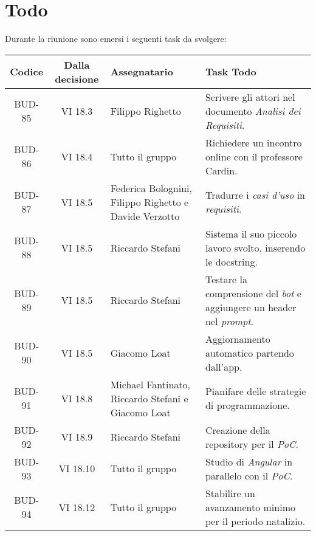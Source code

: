 
\section{Todo}

Durante la riunione sono emersi i seguenti task da svolgere:

\vspace{0.5cm}

\begin{table}[htbp]
\centering
{}
\begin{tabular}{|c|c|p{}|p{}|}
    \hline
    \rowcolor[gray]{0.75}
    \textbf{Codice} & \textbf{Dalla decisione} & \textbf{Assegnatario} & \textbf{Task Todo} \\
    \hline
    BUD-85 & VI 18.3 & Filippo Righetto & Scrivere gli attori nel documento \emph{Analisi dei Requisiti}. \\
    \hline
    BUD-86 & VI 18.4 & Tutto il gruppo & Richiedere un incontro online con il professore Cardin. \\
    \hline
    BUD-87 & VI 18.5 & Federica Bolognini, Filippo Righetto e Davide Verzotto & Tradurre i \emph{casi d'uso} in \emph{requisiti}. \\
    \hline
    BUD-88 & VI 18.5 & Riccardo Stefani & Sistema il suo piccolo lavoro svolto, inserendo le docstring. \\
    \hline
    BUD-89 & VI 18.5 & Riccardo Stefani & Testare la comprensione del \emph{bot} e aggiungere un header nel \emph{prompt}. \\
    \hline
    BUD-90 & VI 18.5 & Giacomo Loat & Aggiornamento automatico partendo dall'app. \\
    \hline
    BUD-91 & VI 18.8 & Michael Fantinato, Riccardo Stefani e Giacomo Loat & Pianifare delle strategie di programmazione.\\
    \hline
    BUD-92 & VI 18.9 & Riccardo Stefani & Creazione della repository per il \emph{PoC}.\\
    \hline
    BUD-93 & VI 18.10 & Tutto il gruppo & Studio di \emph{Angular} in parallelo con il \emph{PoC}. \\
    \hline
    BUD-94 & VI 18.12 & Tutto il gruppo  & Stabilire un avanzamento minimo per il periodo natalizio.\\
    \hline
\end{tabular}
\end{table}